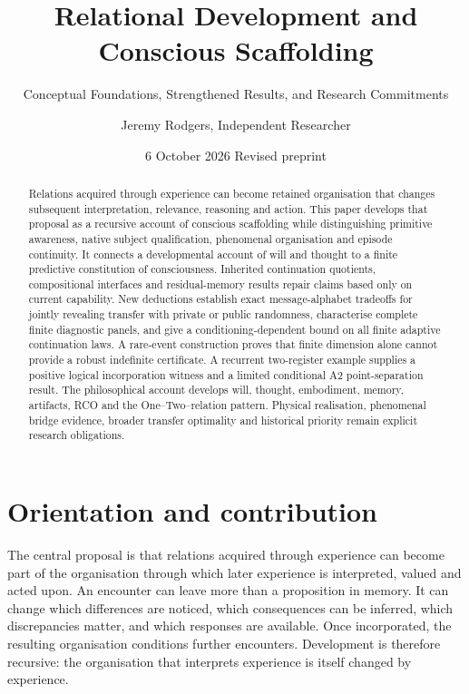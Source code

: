 \documentclass[
  11pt,
  a4paper,
]{article}
\title{Relational Development and Conscious Scaffolding}
\subtitle{Conceptual Foundations, Strengthened Results, and Research
Commitments}
\author{Jeremy Rodgers, Independent Researcher}
\date{6 October 2026 \textbar{} Revised preprint}
\let\originaltableofcontents\tableofcontents
\renewcommand{\tableofcontents}{\clearpage\originaltableofcontents\clearpage}
\begin{document}
\maketitle
\begin{abstract}
Relations acquired through experience can become retained organisation that changes subsequent interpretation, relevance, reasoning and action. This paper develops that proposal as a recursive account of conscious scaffolding while distinguishing primitive awareness, native subject qualification, phenomenal organisation and episode continuity. It connects a developmental account of will and thought to a finite predictive constitution of consciousness. Inherited continuation quotients, compositional interfaces and residual-memory results repair claims based only on current capability. New deductions establish exact message-alphabet tradeoffs for jointly revealing transfer with private or public randomness, characterise complete finite diagnostic panels, and give a conditioning-dependent bound on all finite adaptive continuation laws. A rare-event construction proves that finite dimension alone cannot provide a robust indefinite certificate. A recurrent two-register example supplies a positive logical incorporation witness and a limited conditional A2 point-separation result. The philosophical account develops will, thought, embodiment, memory, artifacts, RCO and the One--Two--relation pattern. Physical realisation, phenomenal bridge evidence, broader transfer optimality and historical priority remain explicit research obligations.
\end{abstract}

{
\hypersetup{linkcolor=}
\setcounter{tocdepth}{2}
\tableofcontents
}
\section{Orientation and
contribution}\label{orientation-and-contribution}

The central proposal is that relations acquired through experience can
become part of the organisation through which later experience is
interpreted, valued and acted upon. An encounter can leave more than a
proposition in memory. It can change which differences are noticed,
which consequences can be inferred, which discrepancies matter, and
which responses are available. Once incorporated, the resulting
organisation conditions further encounters. Development is therefore
recursive: the organisation that interprets experience is itself changed
by experience.
\end{document}
